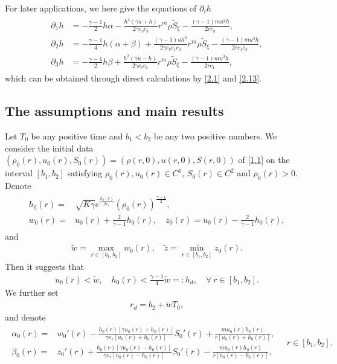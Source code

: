 \documentclass[11pt,reqno]{article}
\newcommand{\fr}{\frac}
\newcommand{\pa}{\partial}
\numberwithin{equation}{section}
\begin{document}
For later applications, we here give the equations of $\pa_ih$
\begin{align}\label{a4}
\begin{split}
\partial_1h &= -\frac{\gamma-1}{2}h\alpha
    -\frac{h^2(\gamma u+h)}{2\gamma c_vc_3}r^m\rho \widetilde{S}_\xi
    -\frac{(\gamma-1)mu^2h}{2rc_3},
    \\
\partial_2h &= -\frac{\gamma-1}{4}h(\alpha+\beta)
    +\frac{(\gamma-1)uh^3}{2\gamma c_vc_1c_3}r^m\rho \widetilde{S}_\xi
    -\frac{(\gamma-1)mu^3h}{2rc_1c_3},
    \\
\partial_3h &= -\frac{\gamma-1}{2}h\beta
    +\frac{h^2(\gamma u-h)}{2\gamma c_vc_1}r^m\rho \widetilde{S}_\xi
    -\frac{(\gamma-1)mu^2h}{2rc_1},
\end{split}
\end{align}
which can be obtained through direct calculations by \eqref{2.1} and \eqref{2.13}.









\subsection{The assumptions and main results}\label{S22}

Let $T_0$ be any positive time and $b_1<b_2$ be any two positive numbers. We consider the initial data $(\rho_0(r), u_0(r), S_0(r))=(\rho(r,0), u(r,0), S(r,0))$ of \eqref{1.1} on the interval $[b_1, b_2]$ satisfying $\rho_0(r), u_0(r)\in C^1$, $S_0(r)\in C^2$
and $\rho_0(r)>0$. Denote
\begin{align}\label{2.14}
\begin{split}
h_0(r)=&\sqrt{K\gamma} e^{\frac{S_0(r)}{2c_v}}(\rho_0(r))^\frac{\gamma-1}{2},\\
w_0(r)=&u_0(r)+\frac{2}{\gamma-1}h_0(r),\quad z_0(r)=u_0(r)-\frac{2}{\gamma-1}h_0(r),
\end{split}
\end{align}
and
\begin{align}\label{2.15}
\tilde{w}=\max_{r\in[b_1,b_2]}w_0(r),\quad \tilde{z}=\min_{r\in[b_1,b_2]}z_0(r).
\end{align}
Then it suggests that
\begin{align}\label{2.16}
u_0(r)<\tilde{w},\quad h_0(r)<\fr{\gamma-1}{4}\tilde{w}=: h_d,\quad \forall\ r\in[b_1,b_2].
\end{align}
We further set
\begin{align}\label{2.18}
r_d=b_2+\tilde{w}T_0,
\end{align}
and denote
\begin{align}\label{2.17}
\begin{split}
\alpha_0(r)=&w_{0}'(r)-\fr{h_0(r)[\gamma u_0(r)+h_0(r)]}{\gamma c_\gamma [u_0(r)+h_0(r)]}S_{0}'(r) +\fr{m u_0(r)h_0(r)}{r[u_0(r)+h_0(r)]}, \\
\beta_0(r)=&z_{0}'(r)+\fr{h_0(r)[\gamma u_0(r)-h_0(r)]}{\gamma c_\gamma [u_0(r)-h_0(r)]}S_{0}'(r) -\fr{m u_0(r)h_0(r)}{r[u_0(r)-h_0(r)]},
\end{split}
\quad r\in[b_1,b_2].
\end{align}
\end{document}
